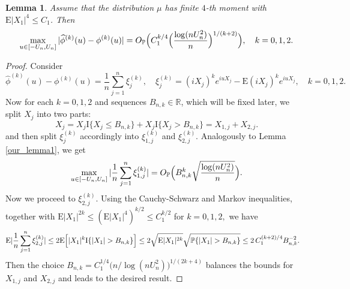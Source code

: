 \documentclass[numbers,webpdf,imaiai]{ima-authoring-template}%
\theoremstyle{thmstyletwo}%
\newtheorem{lemma}{Lemma}%
\newcommand{\R}{\mathbb{R}}
\newcommand{\E}{\mathrm{E}}
\newcommand{\I}{{\mathrm{I}}}
\numberwithin{equation}{section}
\begin{document}
\begin{lemma}\label{our_lemma2}
    Assume that the distribution $\mu$ has finite $4$-th moment with $\E|X_1|^4 \leq C_1$. Then
    \begin{equation*}
        \max_{u\in [-U_n, U_n]} |\widehat{\phi}^{(k)}(u) - \phi^{(k)}(u)| = O_{\mathbb{P}} \Bigl(C_1^{k/4}\Bigl(\frac{\log(nU^2_n)}{n}\Bigr)^{1/(k + 2)}\Bigr), \quad k=0,1,2.
    \end{equation*}
\end{lemma}
\begin{proof}
    Consider
\begin{equation*}
    \widehat{\phi}^{(k)}(u) - \phi^{(k)}(u) = \frac{1}{n}\sum_{j=1}^{n} \xi^{(k)}_j, \quad  \xi^{(k)}_j = (iX_j)^ke^{iuX_j} - \E (iX_j)^ke^{iuX_j}, \quad  k=0,1,2.
\end{equation*}
Now for each $k=0,1,2$ and  sequences $B_{n,k} \in \R$, which will be fixed later, we split $X_j$ into two parts:
\begin{equation*}
    X_j = X_j \I\{X_j \leq B_{n,k}\} + X_j \I\{X_j > B_{n,k}\} = X_{1, j} +X_{2, j}.
\end{equation*}
and then split $\xi^{(k)}_j$ accordingly into  $\xi^{(k)}_{1, j}$ and $\xi^{(k)}_{2, j}$.  Analogously to Lemma \ref{our_lemma1}, we get 
\begin{equation*}
    \max_{u \in [-U_n, U_n]} |\frac{1}{n}\sum_{j=1}^{n}\xi^{(k)}_{1, j}| =O_{\mathbb{P}} \Bigl(B_{n,k}^k \sqrt{\frac{\log(nU_n^2)}{n}}\Bigr).
\end{equation*}
Now we proceed to $\xi^{(k)}_{2, j}$. 
Using the Cauchy-Schwarz  and Markov inequalities, together with $\E|X_1|^{2k}\leq (\E|X_1|^4)^{k/2}\leq C_1^{k/2}$ for $k=0,1,2,$ we have
\begin{align*}
    \E |\frac{1}{n}\sum_{j=1}^{n}\xi^{(k)}_{2, j}| 
    &\leq
    2 \E \Bigl[ |X_1|^k\I\{|X_1| > B_{n,k}\} \Bigr] 
    \leq 2 \sqrt{\E |X_1|^{2k}} \sqrt{\mathbb{P}\{|X_1| > B_{n,k}\}}  \leq 2\, C_1^{(k+2)/4} B_{n,k}^{-2}.
\end{align*}
Then the choice $B_{n,k} = C_1^{1/4}\bigl(n / \log(nU_n^2) \bigr)^{1/(2k + 4)}$ balances the bounds for \(X_{1, j}\) and \(X_{2, j}\) and leads to the desired result. 
\end{proof}
\end{document}
